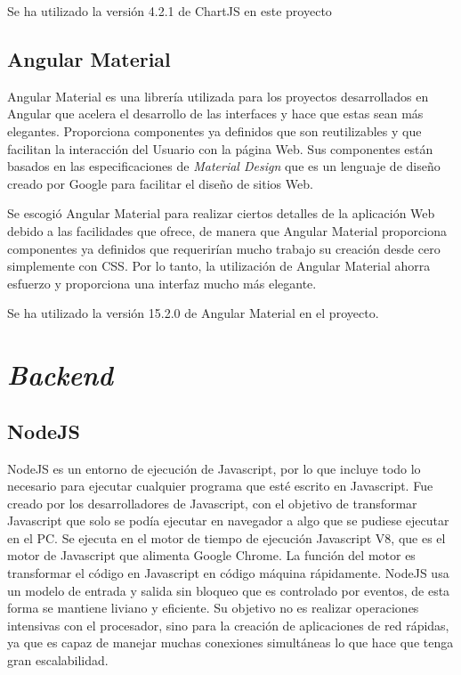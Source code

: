 Se ha utilizado la versión 4.2.1 de ChartJS en este proyecto

\subsection{Angular Material}
Angular Material \cite{angularMaterial} es una librería utilizada para los proyectos desarrollados en Angular que acelera el desarrollo de las interfaces y hace que estas sean más elegantes. Proporciona componentes ya definidos que son reutilizables y que facilitan la interacción del Usuario con la página Web. Sus componentes están basados en las especificaciones de \textit{Material Design} que es un lenguaje de diseño creado por Google para facilitar el diseño de sitios Web. 

Se escogió Angular Material para realizar ciertos detalles de la aplicación Web debido a las facilidades que ofrece, de manera que Angular Material proporciona componentes ya definidos que requerirían mucho trabajo su creación desde cero simplemente con CSS. Por lo tanto, la utilización de Angular Material ahorra esfuerzo y  proporciona una interfaz mucho más elegante.

Se ha utilizado la versión 15.2.0 de Angular Material en el proyecto.

\section{\textit{Backend}}
\subsection{NodeJS}
NodeJS \cite{nodeJS} es un entorno de ejecución de Javascript, por lo que incluye todo lo necesario para ejecutar cualquier programa que esté escrito en Javascript. Fue creado por los desarrolladores de Javascript, con el objetivo de transformar Javascript que solo se podía ejecutar en navegador a algo que se pudiese ejecutar en el PC. Se ejecuta en el motor de tiempo de ejecución Javascript V8, que es el motor de Javascript que alimenta Google Chrome. La función del motor es transformar el código en Javascript en código máquina rápidamente. NodeJS usa un modelo de entrada y salida sin bloqueo que es controlado por eventos, de esta forma se mantiene liviano y eficiente. Su objetivo no es realizar operaciones intensivas con el procesador, sino para la creación de aplicaciones de red rápidas, ya que es capaz de manejar muchas conexiones simultáneas lo que hace que tenga gran escalabilidad.





